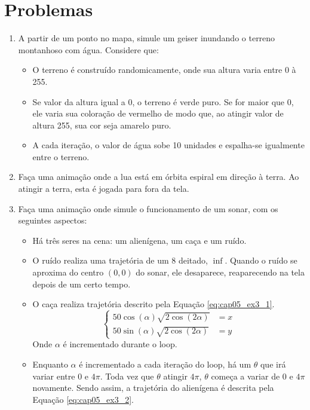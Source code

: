 \section*{Problemas}
\begin{enumerate}
\item
  A partir de um ponto no mapa, simule um geiser inundando o terreno montanhoso com água. Considere que:
  \begin{itemize}
  	\item O terreno é construído randomicamente, onde sua altura varia entre 0 à 255.
  	\item Se valor da altura igual a 0, o terreno é verde puro. Se for maior que 0, ele varia sua coloração de vermelho de modo que, ao atingir valor de altura 255, sua cor seja amarelo puro.
  	\item A cada iteração, o valor de água sobe 10 unidades e espalha-se igualmente entre o terreno.
  \end{itemize}
  \label{ex:cap05_ex1}

\item
	Faça uma animação onde a lua está em órbita espiral em direção à terra. Ao atingir a terra, esta é jogada para fora da tela.
\label{ex:cap05_ex2}

\item
	Faça uma animação onde simule o funcionamento de um sonar, com os seguintes aspectos:
	\begin{itemize}
  	\item Há três seres na cena: um alienígena, um caça e um ruído.
  	\item O ruído realiza uma trajetória de um 8 deitado, $\inf$. Quando o ruído se aproxima do centro $(0,0)$ do sonar, ele desaparece, reaparecendo na tela depois de um certo tempo.
  	\item O caça realiza trajetória descrito pela Equação \ref{eq:cap05_ex3_1}.
  	\begin{equation}\label{eq:cap05_ex3_1}
  	\left\{\begin{matrix}
	 50 \cos(\alpha)\sqrt{2\cos(2\alpha)} & = x \\ 
	 50 \sin(\alpha)\sqrt{2\cos(2\alpha)} & = y
	\end{matrix}\right.
  	\end{equation}
  	Onde $\alpha$ é incrementado durante o loop.
  	\item Enquanto $\alpha$ é incrementado a cada iteração do loop, há um $\theta$ que irá variar entre $0$ e $4\pi$. Toda vez que $\theta$ atingir $4\pi$, $\theta$ começa a variar de $0$ e $4\pi$ novamente.
  	Sendo assim, a trajetória do alienígena é descrita pela Equação \ref{eq:cap05_ex3_2}.
  	

\end{itemize}
\end{enumerate}
